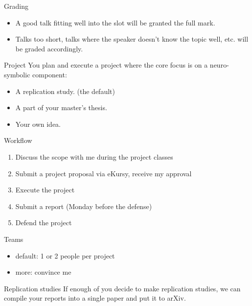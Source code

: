 \documentclass{lecture}
\begin{document}
\begin{frame}{Grading}
    \begin{itemize}
        \item A good talk fitting well into the slot will be granted the full mark. \item Talks too short, talks where the speaker doesn't know the topic well, etc. will be graded accordingly.
    \end{itemize}
\end{frame}

\begin{frame}{Project}
    You plan and execute a project where the core focus is on a neuro-symbolic component:
    \begin{itemize}
        \item A replication study. (the default)
        \item A part of your master's thesis.
        \item Your own idea.        
    \end{itemize}
\end{frame}

\begin{frame}{Workflow}
    \begin{enumerate}
        \item Discuss the scope with me during the project classes
        \item Submit a project proposal via eKursy, receive my approval
        \item Execute the project
        \item Submit a report (Monday before the defense)
        \item Defend the project
    \end{enumerate}
\end{frame}

\begin{frame}{Teams}
    \begin{itemize}
        \item default: 1 or 2 people per project
        \item more: convince me
    \end{itemize}
\end{frame}

\begin{frame}{Replication studies}
    If enough of you decide to make replication studies, we can compile your reports into a single paper and put it to arXiv.
\end{frame}
\end{document}
